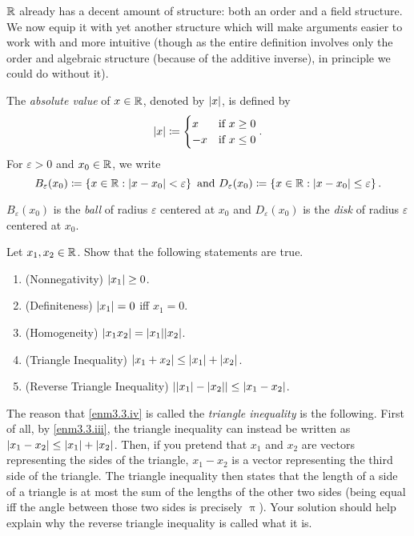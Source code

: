 $\mathbb{R}$ already has a decent amount of structure:  both an order and a field structure.  We now equip it with yet another structure which will make arguments easier to work with and more intuitive (though as the entire definition involves only the order and algebraic structure (because of the additive inverse), in principle we could do without it).
\begin{dfn}
The \emph{absolute value} of $x\in \mathbb{R}$, denoted by $\lvert x\rvert$, is defined by
\begin{equation}
\lvert x\rvert\coloneqq \begin{cases}x & \text{if }x\geq 0 \\ -x & \text{if }x\leq 0\end{cases}.
\end{equation}
For $\varepsilon >0$ and $x_0\in \mathbb{R}$, we write
\begin{equation}
B_{\varepsilon}(x_0)\coloneqq \left\{ x\in \mathbb{R} :|x-x_0|<\varepsilon \right\} \text{ and }D_{\varepsilon}(x_0)\coloneqq \left\{ x\in \mathbb{R} :|x-x_0|\leq \varepsilon \right\} .
\end{equation}
\begin{rmk}
$B_{\varepsilon}(x_0)$ is the \emph{ball} of radius $\varepsilon$ centered at $x_0$ and $D_{\varepsilon}(x_0)$ is the \emph{disk} of radius $\varepsilon$ centered at $x_0$.
\end{rmk}
\end{dfn}
\begin{exr}\label{exr3.1.4}
Let $x_1,x_2\in \mathbb{R}$.  Show that the following statements are true.
\begin{enumerate}
\item \label{enm3.3.i}(Nonnegativity) $\lvert x_1\rvert\geq 0$.
\item \label{enm3.3.ii}(Definiteness) $\lvert x_1\rvert=0$ iff $x_1=0$.
\item \label{enm3.3.iii}(Homogeneity) $\lvert x_1x_2\rvert=\lvert x_1\rvert\lvert x_2\rvert$.
\item \label{enm3.3.iv}(Triangle Inequality) $\lvert x_1+x_2\rvert\leq \lvert x_1\rvert+\lvert x_2\rvert$.
\item \label{enm3.3.v}(Reverse Triangle Inequality) $\lvert\lvert x_1\rvert-\lvert x_2\rvert\rvert\leq \lvert x_1-x_2\rvert$.
\end{enumerate}
\begin{rmk}
The reason that \ref{enm3.3.iv} is called the \emph{triangle inequality} is the following.  First of all, by \ref{enm3.3.iii}, the triangle inequality can instead be written as $\lvert x_1-x_2\rvert\leq \lvert x_1\rvert+\lvert x_2\rvert$.  Then, if you pretend that $x_1$ and $x_2$ are vectors representing the sides of the triangle, $x_1-x_2$ is a vector representing the third side of the triangle.  The triangle inequality then states that the length of a side of a triangle is at most the sum of the lengths of the other two sides (being equal iff the angle between those two sides is precisely $\uppi$).  Your solution should help explain why the reverse triangle inequality is called what it is.
\end{rmk}
\end{exr}
